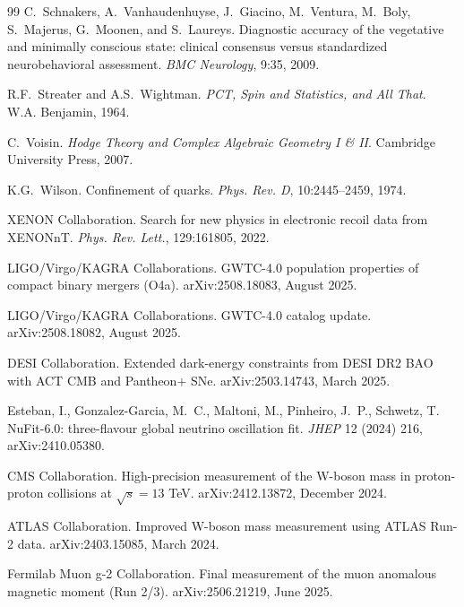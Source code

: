 \documentclass[11pt,a4paper]{amsart}
\theoremstyle{plain}
\theoremstyle{definition}
\begin{document}
\begin{thebibliography}{99}
C.~Schnakers, A.~Vanhaudenhuyse, J.~Giacino, M.~Ventura, M.~Boly, S.~Majerus, G.~Moonen, and S.~Laureys.
\newblock Diagnostic accuracy of the vegetative and minimally conscious state: clinical consensus versus standardized neurobehavioral assessment.
\newblock \emph{BMC Neurology}, 9:35, 2009.

R.F.~Streater and A.S.~Wightman.
\newblock \emph{PCT, Spin and Statistics, and All That}.
\newblock W.A. Benjamin, 1964.

C.~Voisin.
\newblock \emph{Hodge Theory and Complex Algebraic Geometry I \& II}.
\newblock Cambridge University Press, 2007.

K.G.~Wilson.
\newblock Confinement of quarks.
\newblock \emph{Phys. Rev. D}, 10:2445--2459, 1974.

XENON Collaboration.
\newblock Search for new physics in electronic recoil data from XENONnT.
\newblock \emph{Phys. Rev. Lett.}, 129:161805, 2022.

LIGO/Virgo/KAGRA Collaborations.
\newblock GWTC-4.0 population properties of compact binary mergers (O4a).
\newblock arXiv:2508.18083, August 2025.

LIGO/Virgo/KAGRA Collaborations.
\newblock GWTC-4.0 catalog update.
\newblock arXiv:2508.18082, August 2025.

DESI Collaboration.
\newblock Extended dark-energy constraints from DESI DR2 BAO with ACT CMB and Pantheon$+$ SNe.
\newblock arXiv:2503.14743, March 2025.

Esteban, I., Gonzalez-Garcia, M.~C., Maltoni, M., Pinheiro, J.~P., Schwetz, T.
\newblock NuFit-6.0: three-flavour global neutrino oscillation fit.
\newblock \emph{JHEP} 12 (2024) 216, arXiv:2410.05380.

CMS Collaboration.
\newblock High-precision measurement of the W-boson mass in proton-proton collisions at $\sqrt{s} = 13$ TeV.
\newblock arXiv:2412.13872, December 2024.

ATLAS Collaboration.
\newblock Improved W-boson mass measurement using ATLAS Run-2 data.
\newblock arXiv:2403.15085, March 2024.

Fermilab Muon g-2 Collaboration.
\newblock Final measurement of the muon anomalous magnetic moment (Run 2/3).
\newblock arXiv:2506.21219, June 2025.


\end{thebibliography}
\end{document}
